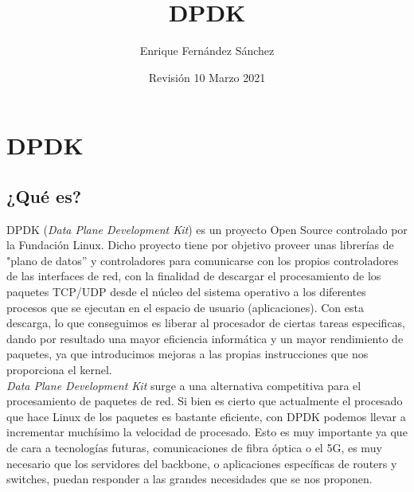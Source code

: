 \documentclass[12pt]{article}
\begin{document}
    \title{DPDK}
    \author{Enrique Fernández Sánchez}
    \date{Revisión 10 Marzo 2021}
   	
    \maketitle
    \tableofcontents
    
    \pagebreak
    
    \section{DPDK}
    \subsection{¿Qué es?}
    \noindent DPDK (\emph{Data Plane Development Kit}) es un proyecto Open Source controlado por la Fundación Linux. Dicho proyecto tiene por objetivo proveer unas librerías de "plano de datos'' y controladores para comunicarse con los propios controladores de las interfaces de red, con la finalidad de descargar el procesamiento de los paquetes TCP/UDP desde el núcleo del sistema operativo a los diferentes procesos que se ejecutan en el espacio de usuario (aplicaciones). Con esta descarga, lo que conseguimos es liberar al procesador de ciertas tareas especificas, dando por resultado una mayor eficiencia informática y un mayor rendimiento de paquetes, ya que introducimos mejoras a las propias instrucciones que nos proporciona el kernel.\\
    
    \noindent \emph{Data Plane Development Kit} surge a una alternativa competitiva para el procesamiento de paquetes de red. Si bien es cierto que actualmente el procesado que hace Linux de los paquetes es bastante eficiente, con DPDK podemos llevar a incrementar muchísimo la velocidad de procesado. Esto es muy importante ya que de cara a tecnologías futuras, comunicaciones de fibra óptica o el 5G, es muy necesario que los servidores del backbone, o aplicaciones específicas de routers y switches, puedan responder a las grandes necesidades que se nos proponen.\\
    
\end{document}
